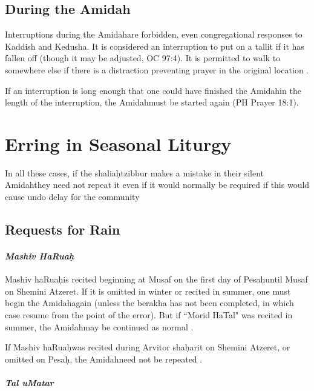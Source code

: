 \documentclass[11pt]{article}
\newcommand{\heth}{\d{h}}
\newcommand{\amidah}{Amidah\space}
\newcommand{\arvit}{Arvit}
\begin{document}
\subsection{During the \amidah}

Interruptions during the \amidah are forbidden, even congregational responses to Kaddish and Kedusha. It is considered an interruption to put on a tallit if it has fallen off (though it may be adjusted, OC 97:4).  It is permitted to walk to somewhere else if there is a distraction preventing prayer in the original location \parencite*[17:15]{PH}.

If an interruption is long enough that one could have finished the \amidah in the length of the interruption, the \amidah must be started again (PH Prayer 18:1).

\section{Erring in Seasonal Liturgy}

In all these cases, if the shalia\heth\space tzibbur makes a mistake in their silent \amidah they need not repeat it even if it would normally be required if this would cause undo delay for the community \parencite*[19:13]{Kitzur}

\subsection{Requests for Rain}

\paragraph{\textit{Mashiv HaRua\heth}}

Mashiv haRua\heth\space is recited beginning at Musaf on the first day of Pesa\heth\space until Musaf on Shemini Atzeret.  If it is omitted in winter or recited in summer, one must begin the \amidah again (unless the berakha has not been completed, in which case resume from the point of the error).  But if ``Morid HaTal" was recited in summer, the \amidah may be continued as normal \parencite*[18:4-5 citing OC 114]{PH}.

If Mashiv haRua\heth was recited during \arvit or sha\heth arit on Shemini Atzeret, or omitted on Pesa\heth , the \amidah need not be repeated \parencite*[19:2,4]{Kitzur}.

\paragraph{\textit{Tal uMatar}}
\end{document}
